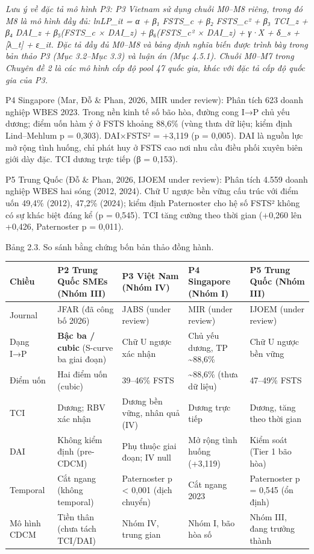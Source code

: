\documentclass[12pt,a4paper]{article}
\begin{document}
\emph{Lưu ý về đặc tả mô hình P3: P3 Vietnam sử dụng chuỗi M0--M8 riêng,
trong đó M8 là mô hình đầy đủ: lnLP\_it = α + β₁ FSTS\_c + β₂ FSTS\_c² +
β₃ TCI\_z + β₄ DAI\_z + β₅(FSTS\_c × DAI\_z) + β₆(FSTS\_c² × DAI\_z) +
γ·X + δ\_s + {[}λ\_t{]} + ε\_it. Đặc tả đầy đủ M0--M8 và bảng định nghĩa
biến được trình bày trong bản thảo P3 (Mục 3.2--Mục 3.3) và luận án (Mục
4.5.1). Chuỗi M0--M7 trong Chuyên đề 2 là các mô hình cấp độ pool 47
quốc gia, khác với đặc tả cấp độ quốc gia của P3.}

P4 Singapore (Mar, Đỗ \& Phan, 2026, MIR under review): Phân tích 623
doanh nghiệp WBES 2023. Trong nền kinh tế số bão hòa, đường cong I→P chủ
yếu dương; điểm uốn hàm ý ở FSTS khoảng 88,6\% (vùng thưa dữ liệu; kiểm
định Lind--Mehlum p = 0,303). DAI×FSTS² = +3,119 (p = 0,005). DAI là
nguồn lực mở rộng tình huống, chỉ phát huy ở FSTS cao nơi nhu cầu điều
phối xuyên biên giới dày đặc. TCI dương trực tiếp (β = 0,153).

P5 Trung Quốc (Đỗ \& Phan, 2026, IJOEM under review): Phân tích 4.559
doanh nghiệp WBES hai sóng (2012, 2024). Chữ U ngược bền vững cấu trúc
với điểm uốn 49,4\% (2012), 47,2\% (2024); kiểm định Paternoster cho hệ
số FSTS² không có sự khác biệt đáng kể (p = 0,545). TCI tăng cường theo
thời gian (+0,260 lên +0,426, Paternoster p = 0,011).

Bảng 2.3. So sánh bằng chứng bốn bản thảo đồng hành.

\begin{longtable}[]{@{}lllll@{}}
\toprule\noalign{}
Chiều & P2 Trung Quốc SMEs (Nhóm III) & P3 Việt Nam (Nhóm IV) & P4
Singapore (Nhóm I) & P5 Trung Quốc (Nhóm III) \\
\midrule\noalign{}
\endhead
\bottomrule\noalign{}
\endlastfoot
Journal & JFAR (đã công bố 2026) & JABS (under review) & MIR (under
review) & IJOEM (under review) \\
Dạng I→P & \textbf{Bậc ba / cubic} (S-curve ba giai đoạn) & Chữ U ngược
xác nhận & Chủ yếu dương, TP \textasciitilde88,6\% & Chữ U ngược bền
vững \\
Điểm uốn & Hai điểm uốn (cubic) & 39--46\% FSTS & \textasciitilde88,6\%
(thưa dữ liệu) & 47--49\% FSTS \\
TCI & Dương; RBV xác nhận & Dương bền vững, nhân quả (IV) & Dương trực
tiếp & Dương, tăng theo thời gian \\
DAI & Không kiểm định (pre-CDCM) & Phụ thuộc giai đoạn; IV null & Mở
rộng tình huống (+3,119) & Kiểm soát (Tier 1 bão hòa) \\
Temporal & Cắt ngang (không temporal) & Paternoster p \textless{} 0,001
(dịch chuyển) & Cắt ngang 2023 & Paternoster p = 0,545 (ổn định) \\
Mô hình CDCM & Tiền thân (chưa tách TCI/DAI) & Nhóm IV, trung gian &
Nhóm I, bão hòa số & Nhóm III, đang trưởng thành \\
\end{longtable}
\end{document}
